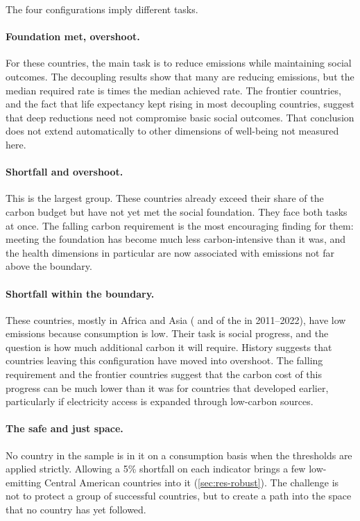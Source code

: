 The four configurations imply different tasks.

\paragraph{Foundation met, overshoot.} For these countries, the main task is to reduce emissions while maintaining social outcomes. The decoupling results show that many are reducing emissions, but the median required rate is \nDecSpeedRatio{} times the median achieved rate. The frontier countries, and the fact that life expectancy kept rising in most decoupling countries, suggest that deep reductions need not compromise basic social outcomes. That conclusion does not extend automatically to other dimensions of well-being not measured here.

\paragraph{Shortfall and overshoot.} This is the largest group. These countries already exceed their share of the carbon budget but have not yet met the social foundation. They face both tasks at once. The falling carbon requirement is the most encouraging finding for them: meeting the foundation has become much less carbon-intensive than it was, and the health dimensions in particular are now associated with emissions not far above the boundary.

\paragraph{Shortfall within the boundary.} These countries, mostly in Africa and Asia (\nWithinLastAfrica{} and \nWithinLastAsia{} of the \nWithinLastTotal{} in 2011--2022), have low emissions because consumption is low. Their task is social progress, and the question is how much additional carbon it will require. History suggests that countries leaving this configuration have moved into overshoot. The falling requirement and the frontier countries suggest that the carbon cost of this progress can be much lower than it was for countries that developed earlier, particularly if electricity access is expanded through low-carbon sources.

\paragraph{The safe and just space.} No country in the sample is in it on a consumption basis when the thresholds are applied strictly. Allowing a 5\% shortfall on each indicator brings a few low-emitting Central American countries into it (\cref{sec:res-robust}). The challenge is not to protect a group of successful countries, but to create a path into the space that no country has yet followed.


